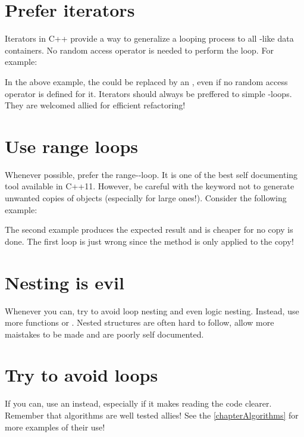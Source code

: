 \section{Prefer iterators}
Iterators in C++ provide a way to generalize a looping process to all 
-like data containers. No random access operator is needed to perform 
the loop. For example:


In the above example, the  could be replaced by an 
, even if no random access operator is defined for it. Iterators 
should always be preffered to simple -loops. They are welcomed allied 
for efficient refactoring!

\section{Use range  loops}
Whenever possible, prefer the range--loop. It is one of the best self 
documenting tool available in C++11. However, be careful with the keyword 
 not to generate unwanted copies of objects (especially for large 
ones!). Consider the following example:


The second example produces the expected result and is cheaper for no copy is 
done. The first loop is just wrong since the  method is only 
applied to the copy!

\section{Nesting is evil}
Whenever you can, try to avoid loop nesting and even logic nesting. Instead, 
use more functions or . Nested structures are often hard 
to follow, allow more maistakes to be made and are poorly self documented.

\section{Try to avoid loops}
If you can, use an  instead, especially if it makes reading 
the code clearer. Remember that algorithms are well tested allies! See the 
\cref{chapterAlgorithms} for more examples of their use!